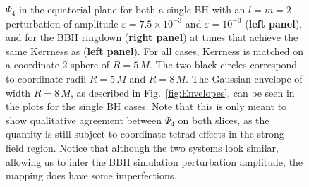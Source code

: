 {\begin{figure}[!htbp]
\caption{$\Psi_4$ in the equatorial plane for both a single BH with an $l=m=2$ perturbation of amplitude $\varepsilon = 7.5 \times 10^{-3}$ and $\varepsilon = 10^{-3}$ (\textbf{left panel}), and for the BBH ringdown (\textbf{right panel}) at times that achieve the same Kerrness as (\textbf{left panel}). For all cases, Kerrness is matched on a coordinate 2-sphere of $R=5\,M$. The two black circles correspond to coordinate radii $R=5\,M$ and $R=8\,M$. The Gaussian envelope of width $R=8\,M$, as described in Fig.~\ref{fig:Envelopes}, can be seen in the plots for the single BH cases. Note that this is only meant to show qualitative agreement between $\Psi_4$ on both slices, as the quantity is still subject to coordinate tetrad effects in the strong-field region. Notice that although the two systems look similar, allowing us to infer the BBH simulation perturbation amplitude, the mapping does have some imperfections.
}
\label{fig:Psi4ComparisonOld}
\end{figure}
}

